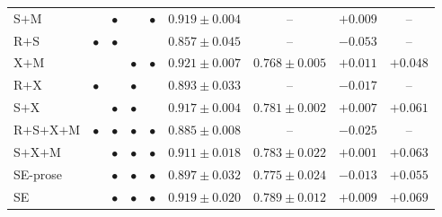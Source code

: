 \documentclass{article}
\begin{document}
\begin{table}[t]
{\begin{tabular}{l|cccc|cccc}
    S$+$M          &         & $\bullet$ &         & $\bullet$ & $0.919 \pm 0.004$           & --                           & $+0.009$          & --                \\
    R$+$S          & $\bullet$ & $\bullet$ &         &         & $0.857 \pm 0.045$           & --                           & $-0.053$          & --                \\
    X$+$M          &         &         & $\bullet$ & $\bullet$ & $\mathbf{0.921 \pm 0.007}$  & $0.768 \pm 0.005$            & $\mathbf{+0.011}$ & $+0.048$          \\
    R$+$X          & $\bullet$ &         & $\bullet$ &         & $0.893 \pm 0.033$           & --                           & $-0.017$          & --                \\
    S$+$X          &         & $\bullet$ & $\bullet$ &         & $0.917 \pm 0.004$           & $0.781 \pm \mathbf{0.002}$   & $+0.007$          & $+0.061$          \\
    R$+$S$+$X$+$M  & $\bullet$ & $\bullet$ & $\bullet$ & $\bullet$ & $0.885 \pm 0.008$           & --                           & $-0.025$          & --                \\
    \midrule
    S$+$X$+$M      &         & $\bullet$ & $\bullet$ & $\bullet$ & $0.911 \pm 0.018$           & $0.783 \pm 0.022$            & $+0.001$          & $+0.063$          \\
    SE-prose       &         & $\bullet$ & $\bullet$ & $\bullet$ & $0.897 \pm 0.032$           & $0.775 \pm 0.024$            & $-0.013$          & $+0.055$          \\
    SE             &         & $\bullet$ & $\bullet$ & $\bullet$ & $0.919 \pm 0.020$           & $\mathbf{0.789 \pm 0.012}$   & $+0.009$          & $\mathbf{+0.069}$ \\
    \bottomrule
  \end{tabular}}
\end{table}
\end{document}
